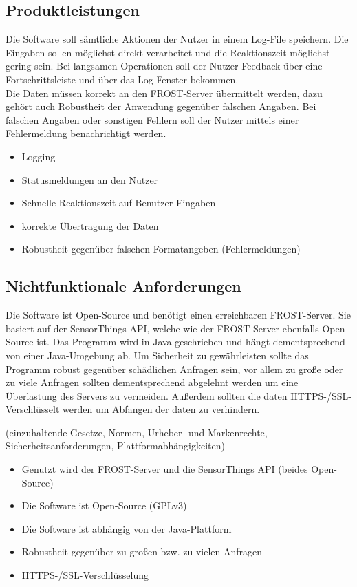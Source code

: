 \documentclass[12 pt]{article}
\begin{document}
\subsection{Produktleistungen}
Die Software soll sämtliche Aktionen der Nutzer in einem Log-File speichern. Die Eingaben sollen möglichst direkt verarbeitet und die Reaktionszeit möglichst gering sein. Bei langsamen Operationen soll der Nutzer Feedback über eine Fortschrittsleiste und über das Log-Fenster bekommen. \\
Die Daten müssen korrekt an den FROST-Server übermittelt werden, dazu gehört auch Robustheit der Anwendung gegenüber falschen Angaben. Bei falschen Angaben oder sonstigen Fehlern soll der Nutzer mittels einer Fehlermeldung benachrichtigt werden.
\begin{itemize}
\item Logging
\item Statusmeldungen an den Nutzer
\item Schnelle Reaktionszeit auf Benutzer-Eingaben
\item korrekte Übertragung der Daten
\item Robustheit gegenüber falschen Formatangeben (Fehlermeldungen)
\end{itemize}

\subsection{Nichtfunktionale Anforderungen}
Die Software ist Open-Source und benötigt einen erreichbaren FROST-Server. Sie basiert auf der SensorThings-API, welche wie der FROST-Server ebenfalls Open-Source ist.
Das Programm wird in Java geschrieben und hängt dementsprechend von einer Java-Umgebung ab.
Um Sicherheit zu gewährleisten sollte das Programm robust gegenüber schädlichen Anfragen sein, vor allem zu große oder zu viele Anfragen sollten dementsprechend abgelehnt werden um eine Überlastung des Servers zu vermeiden.
Außerdem sollten die daten HTTPS-/SSL-Verschlüsselt werden um Abfangen der daten zu verhindern.

(einzuhaltende Gesetze, Normen, Urheber- und Markenrechte,
Sicherheitsanforderungen, Plattformabhängigkeiten)
\begin{itemize}
\item Genutzt wird der FROST-Server und die SensorThings API (beides Open-Source)
\item Die Software ist Open-Source (GPLv3)
\item Die Software ist abhängig von der Java-Plattform
\item Robustheit gegenüber zu großen bzw. zu vielen Anfragen 		
\item HTTPS-/SSL-Verschlüsselung								
\end{itemize}
\end{document}
